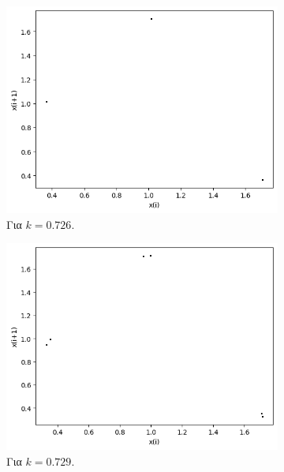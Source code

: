 \begin{figure}[h!]
	\centering
	\begin{subfigure}[b]{0.4\textwidth}
		\centering
		\includegraphics[width=\textwidth]{LateX images/graphs q12/g9}
		\caption{Για $k=0.726$.}
		\label{f:k65}
	\end{subfigure}
	\hfill
	\begin{subfigure}[b]{0.4\textwidth}
		\centering
		\includegraphics[width=\textwidth]{LateX images/graphs q12/g10}
		\caption{Για $k=0.729$.}
		\label{f:k66}
	\end{subfigure}
	\hfill
	\begin{subfigure}[b]{0.4\textwidth}
		\centering

\end{subfigure}
\end{figure}
